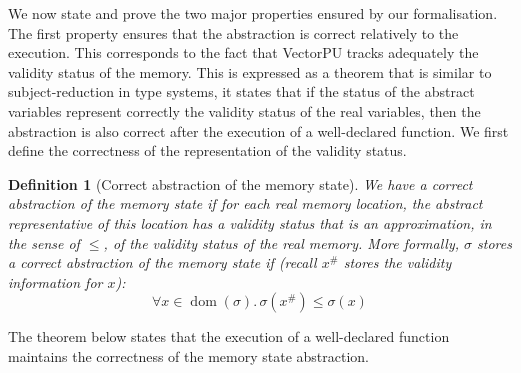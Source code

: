 \documentclass[preprint,12pt]{elsarticle}
\newtheorem{definition}{Definition}
\newcommand{\abs}[1]{#1^\#}
\DeclareMathOperator{\dom}{dom}
\begin{document}
We now state and  prove the two major properties ensured by our formalisation.
The first property ensures that the abstraction is correct relatively to the 
execution. This corresponds to the fact that VectorPU tracks adequately the validity 
status of the 
memory. This is expressed as a theorem that is similar to subject-reduction in type 
systems, it states that if the status of the abstract variables represent correctly the 
validity status of the real variables, then the 
abstraction is also correct after the execution of a  well-declared function.  We first define the correctness of the representation of the validity status.
\begin{definition}[Correct abstraction of the memory state]\label{CorrectAbstraction}
We have a \emph{correct abstraction of the memory state} if for each real memory 
location, the abstract representative of this location has a validity status that is an 
approximation, in the sense of $\leq$, of the validity status of the real memory. More formally, $\sigma$ stores a correct abstraction of the memory state if (recall $\abs x$ stores the validity information for $x$):
\[ \forall x\in \dom(\sigma).\, \sigma(\abs x)\leq\sigma(x) \]
\end{definition}
 The 
theorem below states that the execution of a well-declared function maintains the 
correctness of the memory state 
abstraction. 
\end{document}
